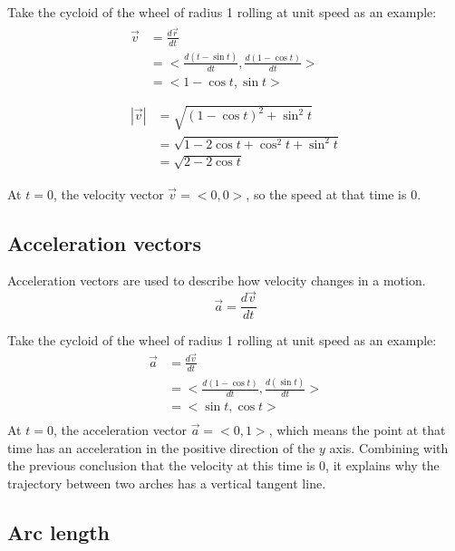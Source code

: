 \documentclass{article}
\begin{document}
Take the cycloid of the wheel of radius 1 rolling at unit speed as an example:
\begin{gather*}
  \begin{split}
    \vec{v} &= \frac{d\vec{r}}{dt} \\
            &= <\frac{d(t - \sin t)}{dt}, \frac{d(1 - \cos t)}{dt}> \\
            &= <1 - \cos t, \sin t> \\
  \end{split} \\
  \begin{split}
    |\vec{v}| &= \sqrt{(1 - \cos t)^2 + \sin^2 t} \\
              &= \sqrt{1 - 2\cos t + \cos^2 t + \sin^2 t} \\
              &= \sqrt{2 - 2\cos t} \\
  \end{split} \\
\end{gather*}
At $t = 0$, the velocity vector $\vec{v} = <0, 0>$, so the speed at that time is
0.

\subsection{Acceleration vectors}

Acceleration vectors are used to describe how velocity changes in a motion.
\begin{equation*}
  \vec{a} = \frac{d\vec{v}}{dt}
\end{equation*}

Take the cycloid of the wheel of radius 1 rolling at unit speed as an example:
\begin{equation*}
  \begin{split}
    \vec{a} &= \frac{d\vec{v}}{dt} \\
            &= <\frac{d(1 - \cos t)}{dt}, \frac{d(\sin t)}{dt}> \\
            &= <\sin t, \cos t> \\
  \end{split}
\end{equation*}
At $t = 0$, the acceleration vector $\vec{a} = <0, 1>$, which means the point at 
that time has an acceleration in the positive direction of the $y$ axis. 
Combining with the previous conclusion that the velocity at this time is 0, it 
explains why the trajectory between two arches has a vertical tangent line.

\subsection{Arc length}
\end{document}
